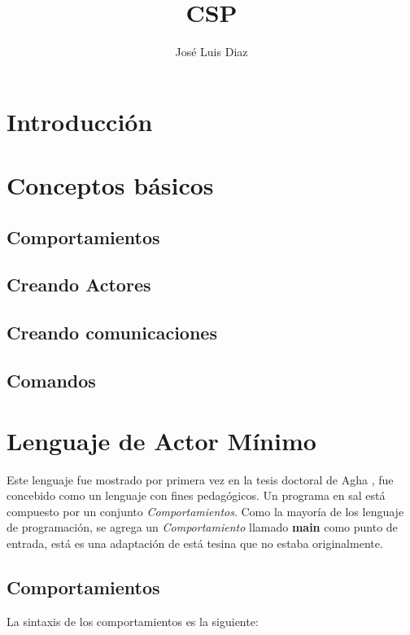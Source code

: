 \documentclass[fleqn]{article}
\title{CSP}
\author{José Luis Diaz}
\date{ }
\begin{document}
 
\maketitle
 
\tableofcontents
 
\section{Introducción}

\section{Conceptos básicos}

\subsection*{Comportamientos}

\subsection*{Creando Actores}

\subsection*{Creando comunicaciones}

\subsection*{Comandos}

\section{Lenguaje de Actor Mínimo}

Este lenguaje fue mostrado por primera vez en la tesis doctoral de Agha
\cite{Agha:1986:AMC:7929}, fue concebido como un lenguaje con fines pedagógicos.
Un programa en sal está compuesto por un conjunto \textit{Comportamientos}.
Como la mayoría de los lenguaje de programación, se agrega un
\textit{Comportamiento} llamado \textbf{main} como punto de entrada, está es una
adaptación de está tesina que no estaba originalmente.

\subsection{Comportamientos}

La sintaxis de los comportamientos es la siguiente:
\end{document}
